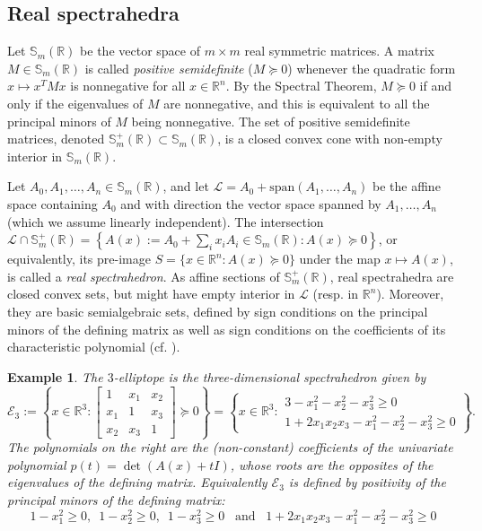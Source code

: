 \documentclass[a4paper,12pt]{article}
\newtheorem{example}{Example}
\newcommand{\R}{\mathbb{R}} %
\newcommand{\sym}{\mathbb{S}} %
\renewcommand{\span}[1]{{\text{span}(#1)}} %
\newcommand{\calL}{\mathcal{L}} %
\begin{document}
\subsection{Real spectrahedra}

Let $\sym_m(\R)$ be the vector space of $m \times m$ real symmetric matrices. A matrix $M \in \sym_m(\R)$
is called {\it positive semidefinite} ($M \succeq 0$) whenever the quadratic
form $x \mapsto x^TMx$ is nonnegative for all $x\in \R^n$. By the Spectral Theorem, $M \succeq 0$
if and only if the eigenvalues of $M$ are nonnegative, and this is equivalent to all the principal minors
of $M$ being nonnegative. The set of positive semidefinite matrices, denoted $\sym_m^+(\R) \subset \sym_m(\R)$,
is a closed convex cone with non-empty interior in $\sym_m(\R)$.

Let $A_0,A_1,\ldots,A_n \in \sym_m(\R)$, and let $\calL = A_0+\span{A_1,\ldots,A_n}$ be the affine space
containing $A_0$ and with direction the vector space spanned by $A_1,\ldots,A_n$ (which we assume linearly
independent). The intersection
$\calL \cap \sym_m^+(\R) = \left\{A(x) := A_0+\sum_i x_i A_i \in \sym_m(\R) : A(x) \succeq 0\right\}$, or
equivalently, its pre-image $S = \{x \in \R^n : A(x) \succeq 0\}$ under the map $x \mapsto A(x)$, is called
a {\it real spectrahedron}. As affine sections of $\sym_m^+(\R)$, real spectrahedra are closed convex sets,
but might have empty interior in $\calL$ (resp. in $\R^n$). Moreover, they are basic semialgebraic sets,
defined by sign conditions on the principal minors of the defining matrix as well as sign conditions on the
coefficients of its characteristic polynomial (cf. ).

\begin{example}\label{ell3}
  The $3$-elliptope is the three-dimensional spectrahedron given by
  $$
  \mathcal{E}_3 :=
  \left\{
  x
  \in \R^3 :
  \begin{bmatrix}
    1 & x_1 & x_2 \\
    x_1 & 1 & x_3 \\
    x_2 & x_3 & 1
  \end{bmatrix}
  \succeq 0
  \right\}
  =
  \left\{
  x
  \in \R^3 :
  \begin{array}{r}
    3-x_1^2-x_2^2-x_3^2 \geq 0 \\
    1+2x_1x_2x_3-x_1^2-x_2^2-x_3^2 \geq 0
  \end{array}
  \right\}.
  $$
  The polynomials on the right are the (non-constant) coefficients of the univariate polynomial
  $p(t) = \det(A(x)+t I)$,
  whose roots are the opposites of the eigenvalues of the defining matrix. Equivalently $\mathcal{E}_3$
  is defined by positivity of the principal minors of the defining matrix:
  $$
  1-x_1^2 \geq 0, \,\,\, 1-x_2^2 \geq 0, \,\,\, 1-x_3^2 \geq 0 \,\,\, \text{ and } \,\,\, 1+2x_1x_2x_3-x_1^2-x_2^2-x_3^2 \geq 0
  $$
\end{example}
\end{document}
